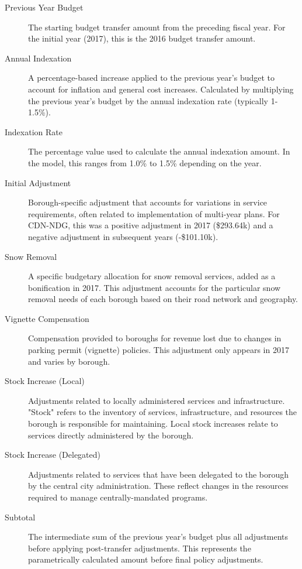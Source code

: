 \documentclass{article}
\begin{document}
\begin{description}
\item[Previous Year Budget] The starting budget transfer amount from the preceding fiscal year. For the initial year (2017), this is the 2016 budget transfer amount.

\item[Annual Indexation] A percentage-based increase applied to the previous year's budget to account for inflation and general cost increases. Calculated by multiplying the previous year's budget by the annual indexation rate (typically 1-1.5\%).

\item[Indexation Rate] The percentage value used to calculate the annual indexation amount. In the model, this ranges from 1.0\% to 1.5\% depending on the year.

\item[Initial Adjustment] Borough-specific adjustment that accounts for variations in service requirements, often related to implementation of multi-year plans. For CDN-NDG, this was a positive adjustment in 2017 (\$293.64k) and a negative adjustment in subsequent years (-\$101.10k).

\item[Snow Removal] A specific budgetary allocation for snow removal services, added as a bonification in 2017. This adjustment accounts for the particular snow removal needs of each borough based on their road network and geography.

\item[Vignette Compensation] Compensation provided to boroughs for revenue lost due to changes in parking permit (vignette) policies. This adjustment only appears in 2017 and varies by borough.

\item[Stock Increase (Local)] Adjustments related to locally administered services and infrastructure. "Stock" refers to the inventory of services, infrastructure, and resources the borough is responsible for maintaining. Local stock increases relate to services directly administered by the borough.

\item[Stock Increase (Delegated)] Adjustments related to services that have been delegated to the borough by the central city administration. These reflect changes in the resources required to manage centrally-mandated programs.

\item[Subtotal] The intermediate sum of the previous year's budget plus all adjustments before applying post-transfer adjustments. This represents the parametrically calculated amount before final policy adjustments.


\end{description}
\end{document}
